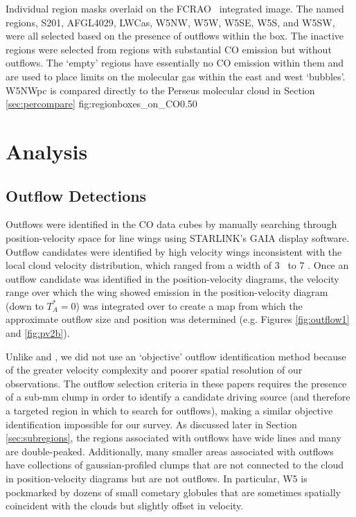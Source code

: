 {Individual region masks overlaid on the FCRAO \twelveco\ integrated image.
The named regions, S201, AFGL4029, LWCas, W5NW, W5W, W5SE, W5S, and W5SW, were all
selected based on the presence of outflows within the box.
The inactive regions were selected from regions with substantial CO emission
but without outflows.  The `empty' regions have essentially no CO emission within
them and are used to place limits on the molecular gas within the east and west
`bubbles'.  W5NWpc is compared directly to the Perseus molecular cloud in 
Section \ref{sec:percompare}
}{fig:regionboxes_on_CO}{0.5}{0}


\section{Analysis}
\subsection{Outflow Detections}
Outflows were identified in the CO data cubes by manually searching through
position-velocity space for line wings using STARLINK's GAIA display software.  Outflow
candidates were identified by high velocity wings inconsistent with the local
cloud velocity distribution, which ranged from a width of 3 \kms\ to  7 \kms.
Once an outflow candidate was identified in the position-velocity diagrams, the
velocity range over which the wing showed emission in the position-velocity
diagram (down to $T_A^*=0$) was integrated over to create a map from which the
approximate outflow size and position was determined (e.g. Figures
\ref{fig:outflow1} and \ref{fig:pv2b}). 

Unlike \citet{curtis2010} and \citet{hatchell2009}, we did not use an
`objective' outflow identification method because of the greater velocity complexity
and poorer spatial resolution of our observations.  The outflow selection
criteria in these papers requires the presence of a sub-mm clump in order to
identify a candidate driving source (and therefore a targeted region in which to search for
outflows), making a similar objective identification impossible for
our survey.
As discussed later in 
Section \ref{sec:subregions}, the regions associated with outflows have wide
lines and many are double-peaked.  Additionally, many smaller areas associated
with outflows have collections of gaussian-profiled clumps that are not connected to
the cloud in position-velocity diagrams but are not outflows.  In particular,
W5 is pockmarked by dozens of small cometary globules that are sometimes
spatially coincident with the clouds but slightly offset in velocity.


